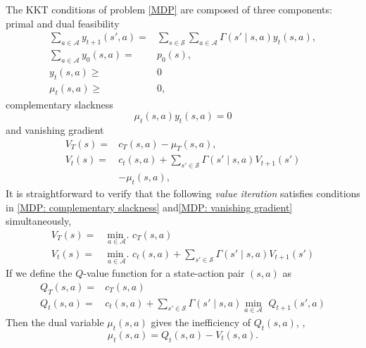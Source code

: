 The KKT conditions of problem \eqref{MDP} are composed of three components: primal and dual feasibility
\begin{equation}
\begin{aligned}
\sum\limits_{a\in\mathcal{A}} y_{t+1}(s', a) = &\sum\limits_{s\in\mathcal{S}}\sum\limits_{a\in\mathcal{A}}\Gamma(s'\mid s, a)y_t(s, a),\\
\sum\limits_{a\in\mathcal{A}}y_0(s, a)=&p_0(s),\\
y_t(s, a)\geq & 0\\
\mu_t(s, a)\geq & 0,  
\end{aligned}\label{MDP: primal dual feasibility}
\end{equation}
 complementary slackness
\begin{equation}
\mu_t(s, a)y_t(s, a)=0\label{MDP: complementary slackness}
\end{equation}
and vanishing gradient
\begin{equation}
\begin{aligned}
V_T(s)=&c_T(s, a)-\mu_T(s, a),\\
V_t(s)=&c_t(s, a)+\sum\limits_{s'\in\mathcal{S}}\Gamma(s'\mid s, a) V_{t+1}(s')\\
&-\mu_t(s, a),
\end{aligned}\label{MDP: vanishing gradient}
\end{equation}
It is straightforward to verify that the following \emph{value iteration} satisfies conditions in \eqref{MDP: complementary slackness} and\eqref{MDP: vanishing gradient} simultaneously,
\begin{equation}
\begin{aligned}
V_T(s)=&\underset{a\in\mathcal{A}}{\min.} \,\,c_T(s, a)\\
V_t(s)=&\underset{a\in\mathcal{A}}{\min.} \,\, c_t(s, a)+\sum\limits_{s'\in\mathcal{S}}\Gamma(s'\mid s, a) V_{t+1}(s')
\end{aligned}\label{MDP: value iteration}
\end{equation}
If we define the \(Q\)-value function for a state-action pair \((s, a)\) as
\begin{equation}
\begin{aligned}
Q_T(s, a)=&c_T(s, a)\\
Q_t(s, a)=& c_t(s, a)+\sum\limits_{s'\in\mathcal{S}}\Gamma(s'\mid s, a) \underset{a\in\mathcal{A}}{\min}\,\,Q_{t+1}(s', a)
\end{aligned}\label{MDP: Q value iteration}
\end{equation}
Then the dual variable \(\mu_t(s, a)\) gives the inefficiency of \(Q_t(s, a)\), \ie ,
\[\mu_t(s, a)=Q_t(s, a)-V_t(s, a).\]


